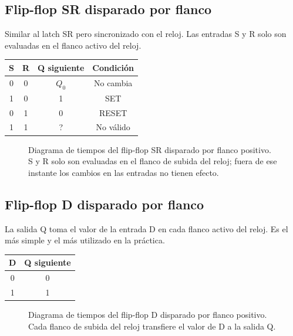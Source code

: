\subsection{Flip-flop SR disparado por flanco}

Similar al latch SR pero sincronizado con el reloj. Las entradas S y R solo son evaluadas en el flanco activo del reloj.

\begin{table}[H]
\centering
\begin{tabular}{cccc}
\toprule
S & R & Q siguiente & Condición \\
\midrule
0 & 0 & $Q_0$ & No cambia \\
1 & 0 & 1 & SET \\
0 & 1 & 0 & RESET \\
1 & 1 & ? & No válido \\
\bottomrule
\end{tabular}
\end{table}

\begin{figure}[H]
\centering

\caption{Diagrama de tiempos del flip-flop SR disparado por flanco positivo.
  S y R solo son evaluadas en el flanco de subida del reloj; fuera de ese instante
  los cambios en las entradas no tienen efecto.}
\end{figure}

\subsection{Flip-flop D disparado por flanco}

La salida Q toma el valor de la entrada D en cada flanco activo del reloj. Es el más simple y el más utilizado en la práctica.

\begin{table}[H]
\centering
\begin{tabular}{cc}
\toprule
D & Q siguiente \\
\midrule
0 & 0 \\
1 & 1 \\
\bottomrule
\end{tabular}
\end{table}

\begin{figure}[H]
\centering

\caption{Diagrama de tiempos del flip-flop D disparado por flanco positivo.
  Cada flanco de subida del reloj transfiere el valor de D a la salida Q.}
\end{figure}

